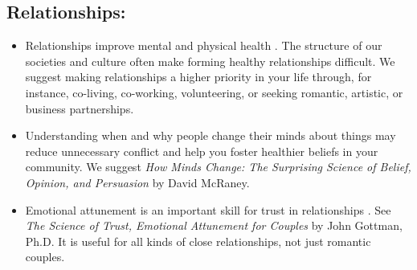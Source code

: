 \documentclass[12pt,letterpaper]{book}
\begin{document}
\subsection*{Relationships:}
\begin{itemize}
   \item Relationships improve mental and physical health \cite{holt-lunstadRelationships}. The structure of our societies and culture often make forming healthy relationships difficult. We suggest making relationships a higher priority in your life through, for instance, co-living, co-working, volunteering, or seeking romantic, artistic, or business partnerships.  
   \item Understanding when and why people change their minds about things may reduce unnecessary conflict and help you foster healthier beliefs in your community. We suggest \textit{How Minds Change: The Surprising Science of Belief, Opinion, and Persuasion} by David McRaney.
   \item Emotional attunement is an important skill for trust in relationships \cite{gottmanTrust}. See \textit{The Science of Trust, Emotional Attunement for Couples} by John Gottman, Ph.D. It is useful for all kinds of close relationships, not just romantic couples.

\end{itemize}
\end{document}
